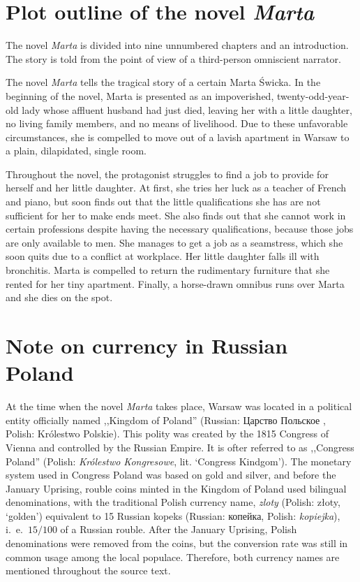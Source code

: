 \section{Plot outline of the novel \textit{Marta}}
The novel \textit{Marta} is divided into nine unnumbered chapters and an introduction. 
The story is told from the point of view of a third-person omniscient narrator.

The novel \textit{Marta} tells the tragical story of a certain Marta Świcka.
In the beginning of the novel, Marta is presented as an impoverished, twenty-odd-year-old lady whose affluent husband had just died, leaving her with a little daughter, no living family members, and no means of livelihood.
Due to these unfavorable circumstances, she is compelled to move out of a lavish apartment in Warsaw to a plain, dilapidated, single room.

Throughout the novel, the protagonist struggles to find a job to provide for herself and her little daughter.
At first, she tries her luck as a teacher of French and piano, but soon finds out that the little qualifications she has are not sufficient for her to make ends meet.
She also finds out that she cannot work in certain professions despite having the necessary qualifications, because those jobs are only available to men.
She manages to get a job as a seamstress, which she soon quits due to a conflict at workplace.
Her little daughter falls ill with bronchitis.
Marta is compelled to return the rudimentary furniture that she rented for her tiny apartment.
Finally, a horse-drawn omnibus runs over Marta and she dies on the spot.

\section{Note on currency in Russian Poland}

At the time when the novel \textit{Marta} takes place, Warsaw was located in a political entity officially named ,,Kingdom of Poland'' (Russian: Царство Польское%
, Polish: Królestwo Polskie).
This polity was created by the 1815 Congress of Vienna and controlled by the Russian Empire.
It is ofter referred to as ,,Congress Poland'' (Polish: \textit{Królestwo Kongresowe}, lit. `Congress Kindgom').
The monetary system used in Congress Poland was based on gold and silver, and before the January Uprising, rouble coins minted in the Kingdom of Poland used bilingual denominations, with the traditional Polish currency name, \textit{zloty} (Polish: złoty, `golden') equivalent to 15 Russian kopeks (Russian: копейка, Polish: \textit{kopiejka}), i.\ e.\ $15/100$ of a Russian rouble.
After the January Uprising, Polish denominations were removed from the coins, but the conversion rate was still in common usage among the local populace.
Therefore, both currency names are mentioned throughout the source text.
